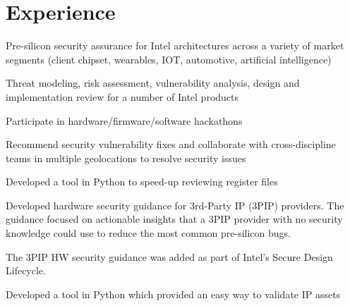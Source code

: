 \documentclass[]{detrano_resume}
\begin{document}
\hfill %
%
%
\begin{minipage}[t]{0.66\textwidth} 
	
	\section{Experience}
	\vspace{\topsep} %
	\begin{tightemize}
		\item  
	\end{tightemize}
	\sectionsep
	
	\vspace{\topsep} %
	\begin{tightemize}
		\item Pre-silicon security assurance for Intel architectures across a variety of market segments (client chipset, wearables, IOT, automotive, artificial intelligence)
		\item Threat modeling, risk assessment, vulnerability analysis, design and implementation review for a number of Intel products 
		\item Participate in hardware/firmware/software hackathons 
		\item Recommend security vulnerability fixes and collaborate with cross-discipline teams in multiple geolocations to resolve security issues 
		\item Developed a tool in Python to speed-up reviewing register files 
	\end{tightemize}
	\sectionsep
	
	\begin{tightemize}
		\item Developed hardware security guidance for 3rd-Party IP (3PIP) providers.  The guidance focused on actionable insights that a 3PIP provider with no security knowledge could use to reduce the most common pre-silicon bugs.
		\item The 3PIP HW security guidance was added as part of Intel's Secure Design Lifecycle.
		\item Developed a tool in Python which provided an easy way to validate IP assets
	\end{tightemize}
	\sectionsep
	

\end{minipage}
\end{document}
